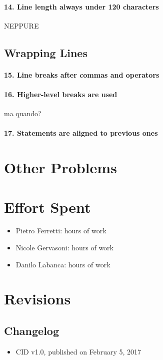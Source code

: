 \documentclass[english]{article}
\begin{document}
\paragraph{14. Line length always under 120 characters}
NEPPURE

\subsection{Wrapping Lines}
\paragraph{15. Line breaks after commas and operators}


\paragraph{16. Higher-level breaks are used}
ma quando?

\paragraph{17. Statements are aligned to previous ones}

\section{Other Problems} %


\section{Effort Spent}
\begin{itemize}
	\item{Pietro Ferretti:  hours of work}
	\item{Nicole Gervasoni:  hours of work}
	\item{Danilo Labanca:  hours of work}
\end{itemize}


\section{Revisions}

\subsection{Changelog}
\begin{itemize}
	\item{CID v1.0, published on February 5, 2017}
\end{itemize}
\end{document}
